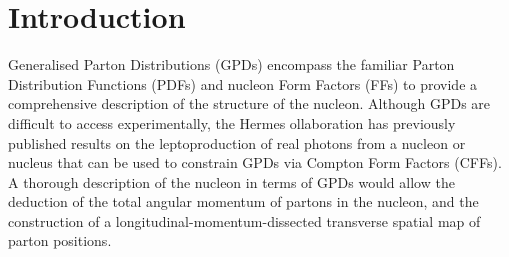 \section{Introduction}
Generalised Parton Distributions (GPDs)
\cite{Mue94,Ji97a,Rad97} encompass the familiar Parton
Distribution Functions (PDFs) and nucleon Form Factors (FFs) to provide a
comprehensive description of the structure of the nucleon.
Although GPDs are difficult to access experimentally, the {\sc Hermes}
ollaboration has previously published results
\cite{Air01,Air06,Air08,Air09,Air10, Air10a, Air10b, Air11} on
the  leptoproduction of real photons from a nucleon or nucleus that can
be used to constrain GPDs via Compton Form Factors (CFFs). A thorough
description of the nucleon in terms of GPDs would allow the deduction
of the total angular momentum of partons in the nucleon, and the
construction of a longitudinal-momentum-dissected transverse spatial map of parton positions.

